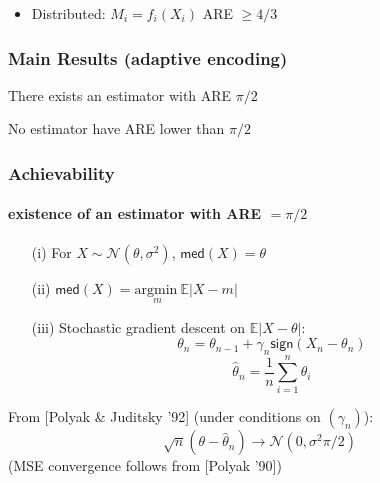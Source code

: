 \documentclass[mathserif]{beamer}
\newcommand{\sgn}{\mathsf{sign}}
\begin{document}
\begin{frame}
\begin{center}
\end{center}

\begin{itemize}
\item Distributed: $M_i = f_i(X_i)$  \hfill{ARE $\geq 4/3$}
\end{itemize}
\end{frame}


\begin{frame}
\frametitle{Main Results (adaptive encoding)}

\begin{theorem}[achievability]
There exists an estimator with ARE $\pi/2$
\end{theorem}

\begin{theorem}[converse]
No estimator have ARE lower than $\pi/2$
\end{theorem}

\end{frame}


\begin{frame}
\frametitle{Achievability}
\framesubtitle{existence of an estimator with ARE $= \pi/2$}

\begin{itemize}
\item[(i)] For $X \sim \mathcal{N}(\theta,\sigma^2)$, $\mathsf{med}(X) = \theta$ 
\pause
\item[(ii)] $\mathsf{med}(X) = \underset{m}{ \mathrm{argmin~}} \mathbb E \left|X-m \right|$
\pause
\item[(iii)] Stochastic gradient descent on $\mathbb E \left| X-\theta \right|$:
\[
\theta_n = \theta_{n-1} + \gamma_n \sgn(X_n - \theta_n)
\]
\[
\widehat{\theta}_n = \frac{1}{n} \sum_{i=1}^n \theta_i 
\]
\end{itemize}
\bigskip
\pause
From [Polyak \& Juditsky '92] (under conditions on $(\gamma_n)$): 
\[
\sqrt{n}(\theta- \widehat{\theta}_n) \rightarrow \mathcal N\left(0, \sigma^2 \pi /2 \right)
\]
(MSE convergence follows from [Polyak '90]) 
\end{frame}
\end{document}
